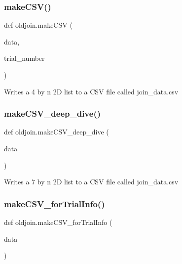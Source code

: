 \subsubsection{\texorpdfstring{make\+C\+S\+V()}{makeCSV()}}
{\footnotesize\ttfamily def oldjoin.\+make\+C\+SV (\begin{DoxyParamCaption}\item[{}]{data,  }\item[{}]{trial\+\_\+number }\end{DoxyParamCaption})}

\begin{DoxyVerb}Writes a 4 by n 2D list to a CSV file called join_data.csv \end{DoxyVerb}
 \mbox{\label{namespaceoldjoin_af8c01b7cf6d0ed355ba3bd5ce60b92fe}} 
\subsubsection{\texorpdfstring{make\+C\+S\+V\+\_\+deep\+\_\+dive()}{makeCSV\_deep\_dive()}}
{\footnotesize\ttfamily def oldjoin.\+make\+C\+S\+V\+\_\+deep\+\_\+dive (\begin{DoxyParamCaption}\item[{}]{data }\end{DoxyParamCaption})}

\begin{DoxyVerb}Writes a 7 by n 2D list to a CSV file called join_data.csv \end{DoxyVerb}
 \mbox{\label{namespaceoldjoin_a57cd17251a242e4b70c053b463abc920}} 
\subsubsection{\texorpdfstring{make\+C\+S\+V\+\_\+for\+Trial\+Info()}{makeCSV\_forTrialInfo()}}
{\footnotesize\ttfamily def oldjoin.\+make\+C\+S\+V\+\_\+for\+Trial\+Info (\begin{DoxyParamCaption}\item[{}]{data }\end{DoxyParamCaption})}

